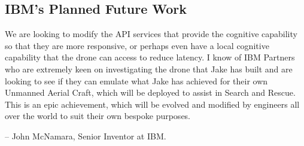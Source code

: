 \documentclass{article}
\begin{document}
\subsection{IBM's Planned Future Work}\label{JonFuture}
\begin{itshape}
We are looking to modify the API services that provide the cognitive capability so that they are more responsive, or perhaps even have a local cognitive capability that the drone can access to reduce latency. I know of IBM Partners who are extremely keen on investigating the drone that Jake has built and are looking to see if they can emulate what Jake has achieved for their own Unmanned Aerial Craft, which will be deployed to assist in Search and Rescue. This is an epic achievement, which will be evolved and modified by engineers all over the world to suit their own bespoke purposes.\end{itshape} -- John McNamara, Senior Inventor at IBM.





\printbibliography[title={Bibliography}]
\end{document}
